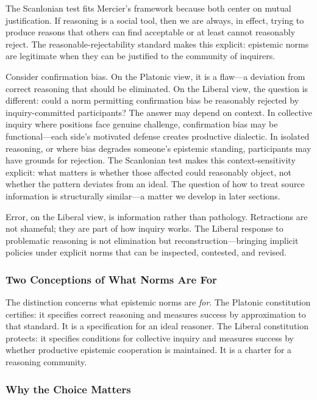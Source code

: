 The Scanlonian test fits Mercier's framework because both center on
mutual justification. If reasoning is a social tool, then we are always,
in effect, trying to produce reasons that others can find acceptable or
at least cannot reasonably reject. The reasonable-rejectability standard
makes this explicit: epistemic norms are legitimate when they can be
justified to the community of inquirers.

Consider confirmation bias. On the Platonic view, it is a flaw---a
deviation from correct reasoning that should be eliminated. On the
Liberal view, the question is different: could a norm permitting
confirmation bias be reasonably rejected by inquiry-committed
participants? The answer may depend on context. In collective inquiry
where positions face genuine challenge, confirmation bias may be
functional---each side's motivated defense creates productive dialectic.
In isolated reasoning, or where bias degrades someone's epistemic
standing, participants may have grounds for rejection. The Scanlonian
test makes this context-sensitivity explicit: what matters is whether
those affected could reasonably object, not whether the pattern deviates
from an ideal. The question of how to treat source information is
structurally similar---a matter we develop in later sections.

Error, on the Liberal view, is information rather than pathology.
Retractions are not shameful; they are part of how inquiry works. The
Liberal response to problematic reasoning is not elimination but
reconstruction---bringing implicit policies under explicit norms that
can be inspected, contested, and revised.

\subsubsection{Two Conceptions of What Norms Are
For}\label{two-conceptions-of-what-norms-are-for}

The distinction concerns what epistemic norms are \emph{for}. The
Platonic constitution certifies: it specifies correct reasoning and
measures success by approximation to that standard. It is a
specification for an ideal reasoner. The Liberal constitution protects:
it specifies conditions for collective inquiry and measures success by
whether productive epistemic cooperation is maintained. It is a charter
for a reasoning community.

\subsubsection{Why the Choice Matters}\label{why-the-choice-matters}

